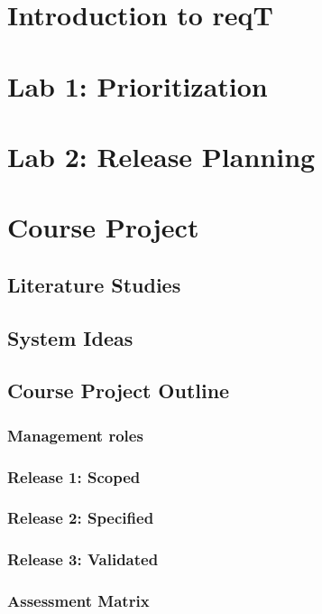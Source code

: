 \documentclass{reqengbook}
\begin{document}
\chapter{Introduction to reqT}

\chapter{Lab 1: Prioritization}

\chapter{Lab 2: Release Planning}

\chapter{Course Project}

\section{Literature Studies}

\section{System Ideas}

\section{Course Project Outline}
\subsection{Management roles}
\subsection{Release 1: Scoped}
\subsection{Release 2: Specified}
\subsection{Release 3: Validated}
\subsection{Assessment Matrix}
\end{document}
